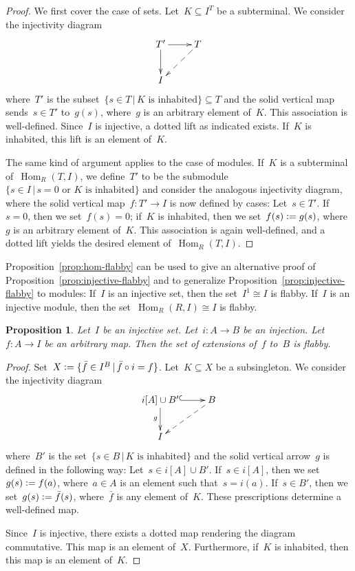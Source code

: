 \documentclass[oneside]{amsart}
\theoremstyle{definition}
\theoremstyle{plain}
\newtheorem{prop}[defn]{Proposition}
\theoremstyle{remark}
\newcommand{\defeq}{\vcentcolon=}
\DeclareMathOperator{\Hom}{Hom}
\renewcommand{\_}{\mathpunct{.}\,}
\begin{document}
\begin{proof}We first cover the case of sets. Let~$K \subseteq I^T$ be a
subterminal. We consider the injectivity diagram
\[ \xymatrix{
  T' \ar[r]\ar[d] & T \ar@{-->}[ld] \\
  I
} \]
where~$T'$ is the subset~$\{ s \in T \,|\, \text{$K$ is inhabited} \} \subseteq T$ and the
solid vertical map sends~$s \in T'$ to~$g(s)$, where~$g$ is an arbitrary element
of~$K$. This association is well-defined. Since~$I$ is injective, a dotted lift
as indicated exists. If~$K$ is inhabited, this lift is an element of~$K$.

The same kind of argument applies to the case of modules. If~$K$ is a
subterminal of~$\Hom_R(T,I)$, we define~$T'$ to be the submodule
$\{ s \in I \,|\, \text{$s = 0$ or $K$ is inhabited} \}$ and consider the
analogous injectivity diagram, where the solid vertical map~$f : T' \to I$ is now
defined by cases: Let~$s \in T'$. If~$s = 0$, then we set~$f(s) = 0$; if~$K$ is
inhabited, then we set~$f(s) \defeq g(s)$, where~$g$ is an arbitrary element
of~$K$. This association is again well-defined, and a dotted lift yields the
desired element of~$\Hom_R(T,I)$.
\end{proof}

Proposition~\ref{prop:hom-flabby} can be used to give an alternative proof of
Proposition~\ref{prop:injective-flabby} and to generalize
Proposition~\ref{prop:injective-flabby} to modules: If~$I$ is an injective set,
then the set~$I^1 \cong I$ is flabby. If~$I$ is an injective module, then the
set~$\Hom_R(R,I) \cong I$ is flabby.

\begin{prop}\label{prop:set-of-extensions-flabby}
Let~$I$ be an injective set. Let~$i : A \to B$ be an injection.
Let~$f : A \to I$ be an arbitrary map. Then the set of extensions of~$f$ to~$B$
is flabby.\end{prop}

\begin{proof}Set~$X \defeq \{ \bar{f} \in I^B \,|\, \bar{f} \circ i =
f \}$. Let~$K \subseteq X$ be a subsingleton. We consider the injectivity diagram
\[ \xymatrix{
  i[A] \cup B' \ar@{^{(}->}[r]\ar[d]_g & B \ar@{-->}[ld] \\
  I
} \]
where~$B'$ is the set~$\{ s \in B \,|\, \text{$K$ is inhabited} \}$ and the solid
vertical arrow~$g$ is defined in the following way: Let~$s \in i[A] \cup B'$.
If~$s \in i[A]$, then we set~$g(s) \defeq f(a)$, where~$a \in A$ is an element such
that~$s = i(a)$. If~$s \in B'$, then we set~$g(s) \defeq \bar{f}(s)$,
where~$\bar{f}$ is any element of~$K$. These prescriptions determine a well-defined
map.

Since~$I$ is injective, there exists a dotted map rendering the diagram
commutative. This map is an element of~$X$. Furthermore, if~$K$ is inhabited,
then this map is an element of~$K$.
\end{proof}
\end{document}
